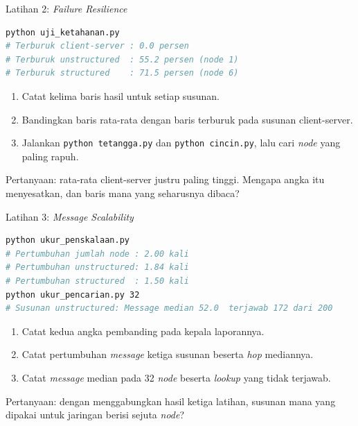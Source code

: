 \documentclass[aspectratio=169, table, 12pt]{beamer}
\begin{document}
\begin{frame}[fragile]{{\Large Latihan 2: \textit{Failure Resilience}}}
  \vspace{3pt}
\begin{lstlisting}[language=bash]
python uji_ketahanan.py
# Terburuk client-server : 0.0 persen
# Terburuk unstructured  : 55.2 persen (node 1)
# Terburuk structured    : 71.5 persen (node 6)
\end{lstlisting}

  \vspace{3pt}
  \begin{enumerate}\small
    \item Catat kelima baris hasil untuk setiap susunan.
    \item Bandingkan baris rata-rata dengan baris terburuk pada susunan
          client-server.
    \item Jalankan \texttt{python tetangga.py} dan \texttt{python cincin.py},
          lalu cari \textit{node} yang paling rapuh.
  \end{enumerate}

  \vspace{3pt}
  {\small Pertanyaan: rata-rata client-server justru paling tinggi. Mengapa
  angka itu menyesatkan, dan baris mana yang seharusnya dibaca?}
\end{frame}

\begin{frame}[fragile]{{\Large Latihan 3: \textit{Message Scalability}}}
  \vspace{3pt}
\begin{lstlisting}[language=bash]
python ukur_penskalaan.py
# Pertumbuhan jumlah node : 2.00 kali
# Pertumbuhan unstructured: 1.84 kali
# Pertumbuhan structured  : 1.50 kali
python ukur_pencarian.py 32
# Susunan unstructured: Message median 52.0  terjawab 172 dari 200
\end{lstlisting}

  \vspace{3pt}
  \begin{enumerate}\small
    \item Catat kedua angka pembanding pada kepala laporannya.
    \item Catat pertumbuhan \textit{message} ketiga susunan beserta \textit{hop} mediannya.
    \item Catat \textit{message} median pada 32 \textit{node} beserta \textit{lookup} yang tidak
          terjawab.
  \end{enumerate}

  \vspace{3pt}
  {\small Pertanyaan: dengan menggabungkan hasil ketiga latihan, susunan mana
  yang dipakai untuk jaringan berisi sejuta \textit{node}?}
\end{frame}
\end{document}
